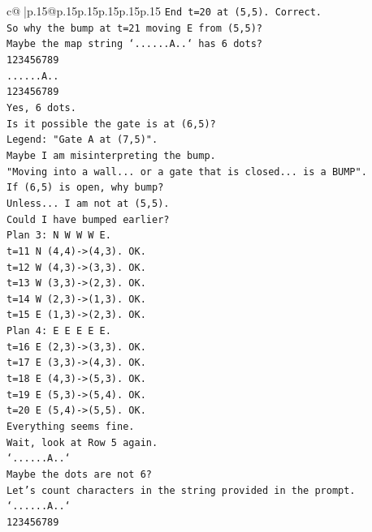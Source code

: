 \documentclass{article}
\begin{document}
{\begin{supertabular}{c@{$\;$}|p{.15\linewidth}@{}p{.15\linewidth}p{.15\linewidth}p{.15\linewidth}p{.15\linewidth}p{.15\linewidth}}
{{{\texttt{End t=20 at (5,5). Correct.} \\
\texttt{So why the bump at t=21 moving E from (5,5)?} \\
\texttt{Maybe the map string `......A..` has 6 dots?} \\
\texttt{123456789} \\
\texttt{......A..} \\
\texttt{123456789} \\
\texttt{Yes, 6 dots.} \\
\texttt{Is it possible the gate is at (6,5)?} \\
\texttt{Legend: "Gate A at (7,5)".} \\
\texttt{Maybe I am misinterpreting the bump.} \\
\texttt{"Moving into a wall... or a gate that is closed... is a BUMP".} \\
\texttt{If (6,5) is open, why bump?} \\
\texttt{Unless... I am not at (5,5).} \\
\texttt{Could I have bumped earlier?} \\
\texttt{Plan 3: N W W W E.} \\
\texttt{t=11 N (4,4){-}>(4,3). OK.} \\
\texttt{t=12 W (4,3){-}>(3,3). OK.} \\
\texttt{t=13 W (3,3){-}>(2,3). OK.} \\
\texttt{t=14 W (2,3){-}>(1,3). OK.} \\
\texttt{t=15 E (1,3){-}>(2,3). OK.} \\
\texttt{Plan 4: E E E E E.} \\
\texttt{t=16 E (2,3){-}>(3,3). OK.} \\
\texttt{t=17 E (3,3){-}>(4,3). OK.} \\
\texttt{t=18 E (4,3){-}>(5,3). OK.} \\
\texttt{t=19 E (5,3){-}>(5,4). OK.} \\
\texttt{t=20 E (5,4){-}>(5,5). OK.} \\
\texttt{Everything seems fine.} \\
\texttt{Wait, look at Row 5 again.} \\
\texttt{`......A..`} \\
\texttt{Maybe the dots are not 6?} \\
\texttt{Let's count characters in the string provided in the prompt.} \\
\texttt{`......A..`} \\
\texttt{123456789} \\
}}}
\end{supertabular}}
\end{document}
